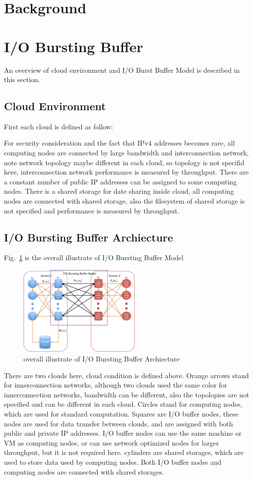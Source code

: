 \documentclass[JIP,draft]{ipsj}
\begin{document}
\section{Background}

\section{I/O Bursting Buffer}
An overview of cloud environment and I/O Burst Buffer Model is described in this section.

\subsection{Cloud Environment}
First each cloud is defined as follow:


For security consideration and the fact that IPv4 addresses becomes rare, all computing nodes are connected by large bandwidth and interconnection network, note network topology maybe different in each cloud, so topology is not specifid here, interconnection network performance is measured by throughput.
There are a constant number of public IP addresses can be assigned to some computing nodes.
There is a shared storage for date sharing inside cloud, all computing nodes are connected with shared storage, also the filesystem of shared storage is not specified and performance is measured by throughput.


\subsection{I/O Bursting Buffer Archiecture}
Fig.~\ref{overview} is the overall illustrate of I/O Bursting Buffer Model
\begin{figure}[tb]
	\centering
	\includegraphics[width=6cm]{overview}
	\caption{overall illustrate of I/O Bursting Buffer Archiecture}
	\label{overview}
\end{figure}
There are two clouds here, cloud condition is defined above.
Orange arrows stand for innerconnection networks, although two clouds used the same color for innerconnection networks, bandwidth can be different, also the topolopies are not specified and can be different in each cloud.
Circles stand for computing nodes, which are used for standard computation.
Squares are I/O buffer nodes, these nodes are used for data transfer between clouds, and are assigned with both public and private IP addresses.
I/O buffer nodes can use the same machine or VM as computing nodes, or can use network optimized nodes for larger throughput, but it is not required here.
cylinders are shared storages, which are used to store data used by computing nodes.
Both I/O buffer nodes and computing nodes are connected with shared storages.
\end{document}
